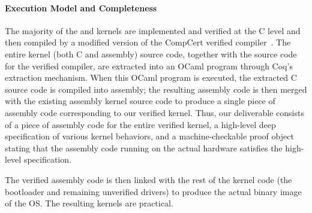 

\paragraph{Execution Model and Completeness}
The majority of the {\mCTOS} and \cCTOS{} kernels are implemented and verified 
at the C level and then compiled by a modified version of the CompCert verified
compiler~\cite{dscal15}.  The entire kernel (both C and assembly)
source code, together with the source code for the verified compiler,
are extracted into an OCaml program through Coq's extraction
mechanism. When this OCaml program is executed, the extracted C source code 
is compiled into assembly; the resulting assembly code is then merged 
with the existing assembly kernel source code to produce a single piece 
of assembly code corresponding to our verified kernel.  Thus, our deliverable 
consists of a piece of assembly code for the entire verified kernel, a 
high-level deep specification of various kernel behaviors, and a 
machine-checkable proof object stating that the assembly code running on 
the actual hardware satisfies the high-level specification.

The verified assembly code is then linked with the rest of the kernel code
(the bootloader and remaining unverified drivers) to produce the
actual binary image of the OS. The resulting kernels are practical.

